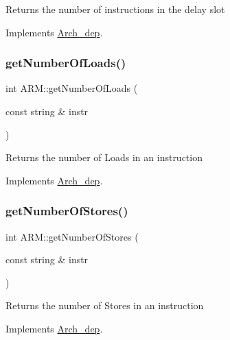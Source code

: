 Returns the number of instructions in the delay slot 

Implements \hyperlink{classArch__dep_a7f9d441d7b402294c6faf7b81ee5aa59}{Arch\+\_\+dep}.

\mbox{\label{classARM_afaa30a7fb0948c057acfc2673c4dc4c6}} 
\subsubsection{\texorpdfstring{get\+Number\+Of\+Loads()}{getNumberOfLoads()}}
{\footnotesize\ttfamily int A\+R\+M\+::get\+Number\+Of\+Loads (\begin{DoxyParamCaption}\item[{const string \&}]{instr }\end{DoxyParamCaption})\hspace{0.3cm}{\ttfamily [virtual]}}

Returns the number of Loads in an instruction 

Implements \hyperlink{classArch__dep_a914556a124481b77698440f0cf6a5f24}{Arch\+\_\+dep}.

\mbox{\label{classARM_a624c0346f9f963c9f42ae155c67e728f}} 
\subsubsection{\texorpdfstring{get\+Number\+Of\+Stores()}{getNumberOfStores()}}
{\footnotesize\ttfamily int A\+R\+M\+::get\+Number\+Of\+Stores (\begin{DoxyParamCaption}\item[{const string \&}]{instr }\end{DoxyParamCaption})\hspace{0.3cm}{\ttfamily [virtual]}}

Returns the number of Stores in an instruction 

Implements \hyperlink{classArch__dep_afd76af2d5947f461e8a04be6b45c2596}{Arch\+\_\+dep}.

\mbox{\label{classARM_a19df5de29d005c2629ea2e02f3312ccf}} 
